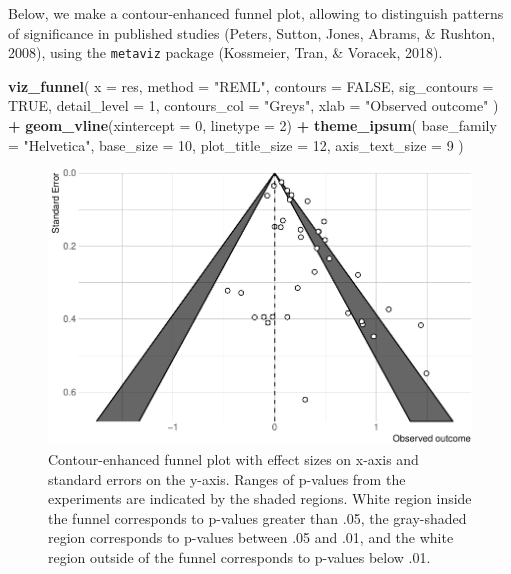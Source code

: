 \documentclass[floatsintext,doc]{apa6}
\newenvironment{Shaded}{\begin{snugshade}}{\end{snugshade}}
\newcommand{\DataTypeTok}[1]{\textcolor[rgb]{0.13,0.29,0.53}{#1}}
\newcommand{\DecValTok}[1]{\textcolor[rgb]{0.00,0.00,0.81}{#1}}
\newcommand{\KeywordTok}[1]{\textcolor[rgb]{0.13,0.29,0.53}{\textbf{#1}}}
\newcommand{\NormalTok}[1]{#1}
\newcommand{\OperatorTok}[1]{\textcolor[rgb]{0.81,0.36,0.00}{\textbf{#1}}}
\newcommand{\OtherTok}[1]{\textcolor[rgb]{0.56,0.35,0.01}{#1}}
\newcommand{\StringTok}[1]{\textcolor[rgb]{0.31,0.60,0.02}{#1}}
\begin{document}
Below, we make a contour-enhanced funnel plot, allowing to distinguish patterns of significance in published studies (Peters, Sutton, Jones, Abrams, \& Rushton, 2008), using the \texttt{metaviz} package (Kossmeier, Tran, \& Voracek, 2018).

\begin{Shaded}
\begin{Highlighting}[]
\KeywordTok{viz_funnel}\NormalTok{(}
    \DataTypeTok{x =}\NormalTok{ res, }\DataTypeTok{method =} \StringTok{"REML"}\NormalTok{,}
    \DataTypeTok{contours =} \OtherTok{FALSE}\NormalTok{, }\DataTypeTok{sig_contours =} \OtherTok{TRUE}\NormalTok{, }\DataTypeTok{detail_level =} \DecValTok{1}\NormalTok{,}
    \DataTypeTok{contours_col =} \StringTok{"Greys"}\NormalTok{,}
    \DataTypeTok{xlab =} \StringTok{"Observed outcome"}
\NormalTok{    ) }\OperatorTok{+}
\StringTok{    }\KeywordTok{geom_vline}\NormalTok{(}\DataTypeTok{xintercept =} \DecValTok{0}\NormalTok{, }\DataTypeTok{linetype =} \DecValTok{2}\NormalTok{) }\OperatorTok{+}
\StringTok{    }\KeywordTok{theme_ipsum}\NormalTok{(}
        \DataTypeTok{base_family =} \StringTok{"Helvetica"}\NormalTok{,}
        \DataTypeTok{base_size =} \DecValTok{10}\NormalTok{, }\DataTypeTok{plot_title_size =} \DecValTok{12}\NormalTok{, }\DataTypeTok{axis_text_size =} \DecValTok{9}
\NormalTok{        )}
\end{Highlighting}
\end{Shaded}

\begin{figure}[H]

{\centering \includegraphics[width=0.75\linewidth]{supplementary_materials_files/figure-latex/funnel2-1} 

}

\caption{Contour-enhanced funnel plot with effect sizes on x-axis and standard errors on the y-axis. Ranges of p-values from the experiments are indicated by the shaded regions. White region inside the funnel corresponds to p-values greater than .05, the gray-shaded region corresponds to p-values between .05 and .01, and the white region outside of the funnel corresponds to p-values below .01.}\label{fig:funnel2}
\end{figure}
\end{document}
